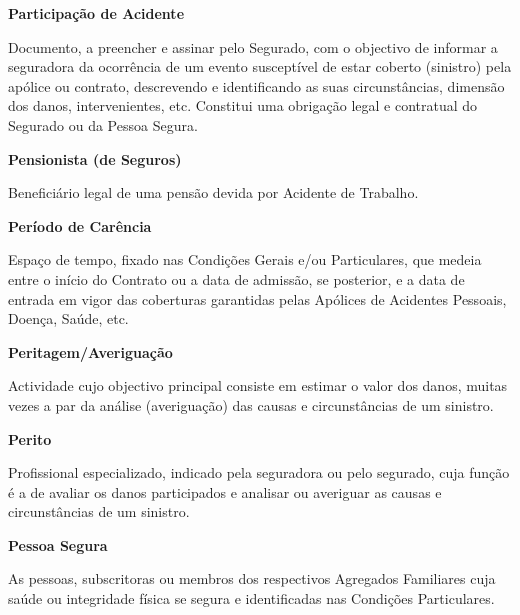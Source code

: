 \begin{description}
\item \textbf{Participação de Acidente}

Documento, a preencher e assinar pelo Segurado, com o objectivo de informar a seguradora da ocorrência de um evento susceptível de estar coberto (sinistro) pela apólice ou contrato, descrevendo e identificando as suas circunstâncias, dimensão dos danos, intervenientes, etc. Constitui uma obrigação legal e contratual do Segurado ou da Pessoa Segura.
\end{description}

\begin{description}
\item \textbf{Pensionista (de Seguros)}

Beneficiário legal de uma pensão devida por Acidente de Trabalho.
\end{description}

\begin{description}
\item \textbf{Período de Carência}

Espaço de tempo, fixado nas Condições Gerais e/ou Particulares, que medeia entre o início do Contrato ou a data de admissão, se posterior, e a data de entrada em vigor das coberturas garantidas pelas Apólices de Acidentes Pessoais, Doença, Saúde, etc.
\end{description}

\begin{description}
\item \textbf{Peritagem/Averiguação}

Actividade cujo objectivo principal consiste em estimar o valor dos danos, muitas vezes a par da análise (averiguação) das causas e circunstâncias de um sinistro.
\end{description}

\begin{description}
\item \textbf{Perito}

Profissional especializado, indicado pela seguradora ou pelo segurado, cuja função é a de avaliar os danos participados e analisar ou averiguar as causas e circunstâncias de um sinistro.
\end{description}

\begin{description}
\item \textbf{Pessoa Segura}

As pessoas, subscritoras ou membros dos respectivos Agregados Familiares cuja saúde ou integridade física se segura e identificadas nas Condições Particulares.
\end{description}

